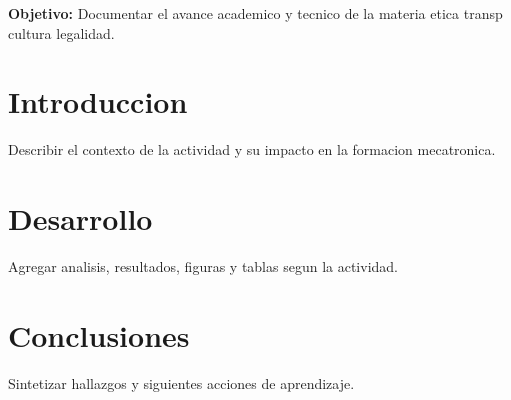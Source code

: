 \documentclass[spanish,letterpaper,oneside]{article}
\begin{document}
\templatePortrait
\templatePagecfg
\onehalfspacing

\begin{abstractd}
\textbf{Objetivo:} Documentar el avance academico y tecnico de la materia etica transp cultura legalidad.
\end{abstractd}

\templateIndex
\templateFinalcfg

\section{Introduccion}
Describir el contexto de la actividad y su impacto en la formacion mecatronica.

\section{Desarrollo}
Agregar analisis, resultados, figuras y tablas segun la actividad.

\section{Conclusiones}
Sintetizar hallazgos y siguientes acciones de aprendizaje.



\end{document}

